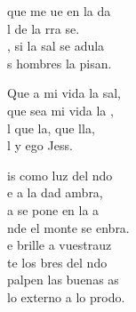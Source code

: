 \begin{cancion}%
	 que me ue en la da\\
	l de la rra se. \\
	, si la sal se adula\\
	s hombres la pisan.\\
	\begin{chorus}%
	Que a mi vida la sal,\\
	que sea mi vida la ,\\
	l que la,  que lla,\\
	l y ego Jess.\\
	\end{chorus}%
	is como luz del ndo\\
	e a la dad ambra,\\
	a se pone en la a\\
	nde el monte se enbra.\\
	e brille a vuestrauz\\
	te los bres del ndo\\
	 palpen las buenas as\\
	 lo externo a lo prodo.\\
\end{cancion}%
